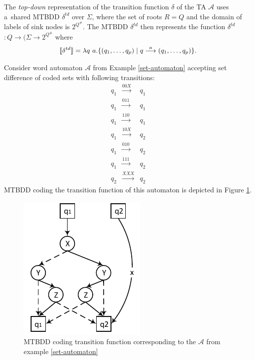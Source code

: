 The \emph{top-down} representation of the transition function $\delta$ of the TA
$\mathcal{A}$ uses a~shared MTBDD $\delta^{td}$ over $\Sigma$, where the set of
roots $R = Q$ and the domain of labels of sink nodes is $2^{Q^\#}$. The MTBDD
$\delta^{td}$ then represents the function \textlbrackdbl $\delta^{td}$
\textrbrackdbl $: Q \rightarrow (\Sigma \rightarrow 2^{Q^\#}$ where
\begin{equation} \text{\textlbrackdbl} \delta^{td} \text{\textrbrackdbl} =
\lambda q\ a .
\{(q_1,\ldots,q_p) \mid q \overset{a}{\longrightarrow} (q_1,\ldots,q_p)\}.
\end{equation}
\newpage
\noindent\hrulefill
\begin{example}
 Consider word automaton $\mathcal{A}$ from Example
 \ref{set-automaton} accepting set difference of coded sets with following
 transitions:
 \begin{eqnarray*}
  q_1 & \overset{00X}{\longrightarrow} & q_1\\
  q_1 & \overset{011}{\longrightarrow} & q_1\\
  q_1 & \overset{110}{\longrightarrow} & q_1\\
  q_1 & \overset{10X}{\longrightarrow} & q_2\\
  q_1 & \overset{010}{\longrightarrow} & q_2\\
  q_1 & \overset{111}{\longrightarrow} & q_2\\
  q_2 & \overset{XXX}{\longrightarrow} & q_2
 \end{eqnarray*}
  MTBDD coding the transition function of this automaton is depicted in Figure
  \ref{mtbdd}.
 
 \begin{figure}[h!]
  \begin{center}
   \includegraphics{fig/bdd-transition-function-encoding}
  \end{center}
  \caption{MTBDD coding transition function corresponding to the
  $\mathcal{A}$ from example
  \ref{set-automaton}}\label{mtbdd}
 \end{figure}
 
\end{example}

